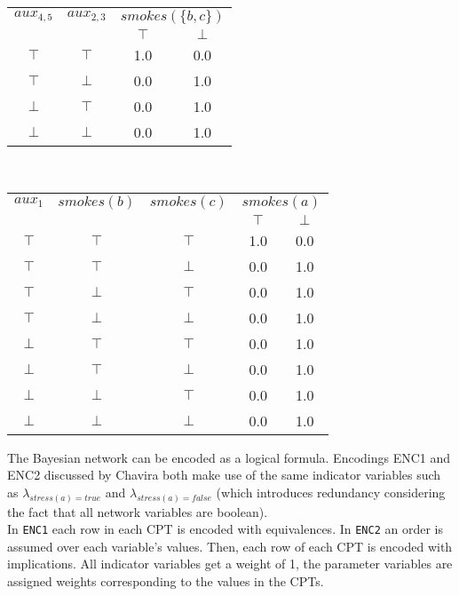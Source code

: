 \begin{multicols*}{2}
\begin{center}
	\begin{tabular}{cc|cc}
		\underline{$aux_{4,5}$} & \underline{$aux_{2,3}$} & \multicolumn{2}{c}{\underline{$smokes(\{b,c\})$}} \\
		& & $\top$ & $\bot$ \\
		$\top$ & $\top$ & 1.0 & 0.0 \\
		$\top$ & $\bot$ & 0.0 & 1.0 \\
		$\bot$ & $\top$ & 0.0 & 1.0 \\
		$\bot$ & $\bot$ & 0.0 & 1.0 \\
	\end{tabular}
	\vspace{0.5cm}\\
	
	\begin{tabular}{ccc|cc}
		\underline{$aux_{1}$} & \underline{$smokes(b)$} & \underline{$smokes(c)$} & \multicolumn{2}{c}{\underline{$smokes(a)$}} \\
		& & & $\top$ & $\bot$ \\
		$\top$ & $\top$ & $\top$ & 1.0 & 0.0 \\
		$\top$ & $\top$ & $\bot$ & 0.0 & 1.0 \\
		$\top$ & $\bot$ & $\top$ & 0.0 & 1.0 \\
		$\top$ & $\bot$ & $\bot$ & 0.0 & 1.0 \\
		$\bot$ & $\top$ & $\top$ & 0.0 & 1.0 \\
		$\bot$ & $\top$ & $\bot$ & 0.0 & 1.0 \\
		$\bot$ & $\bot$ & $\top$ & 0.0 & 1.0 \\
		$\bot$ & $\bot$ & $\bot$ & 0.0 & 1.0 \\
	\end{tabular}
	\vspace{0.5cm}

\end{center}



The Bayesian network can be encoded as a logical formula. Encodings ENC1 and ENC2 discussed by Chavira \cite{chavira} both make use of the same indicator variables such as $\lambda_{stress(a)=true}$ and $\lambda_{stress(a)=false}$ (which introduces redundancy considering the fact that all network variables are boolean). \\

\noindent In \texttt{ENC1} each row in each CPT is encoded with equivalences. In \texttt{ENC2} an order is assumed over each variable's values. Then, each row of each CPT is encoded with implications. All indicator variables get a weight of 1, the parameter variables are assigned weights corresponding to the values in the CPTs.\\


\end{multicols*}
